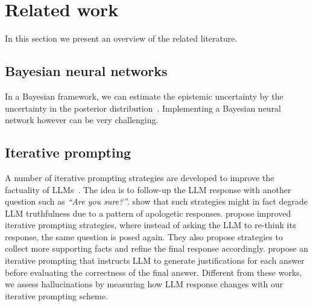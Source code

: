 \section{Related work}


In this section we present an overview of the related literature.

\subsection{Bayesian neural networks}

In a Bayesian framework, we can estimate the epistemic uncertainty by the uncertainty in the posterior distribution~\citep{Neal2012, Gal-2016, wang2024subjectiveuncertainty}. Implementing a Bayesian neural network however can be very challenging.

\subsection{Iterative prompting}

A number of iterative prompting strategies are developed to improve the factuality of LLMs~\citep{chen2023universalselfconsistencylargelanguage,krishna2023intersectionselfcorrectiontrustlanguage,laban2024surechallengingllmsleads}. The idea is to follow-up the LLM response with another question such as \textit{``Are you sure?''}. \citet{krishna2024understanding} show that such strategies might in fact degrade LLM truthfulness due to a pattern of apologetic responses. \citet{krishna2024understanding} propose improved iterative prompting strategies, where instead of asking the LLM to re-think its response, the same question is posed again. They also propose strategies to collect more supporting facts and refine the final response accordingly. \citet{li2024thinktwice} propose an iterative prompting that instructs LLM to generate
justifications for each answer before evaluating the correctness of the final answer. Different from these works, we assess hallucinations by measuring how LLM response changes with our iterative prompting scheme.  

